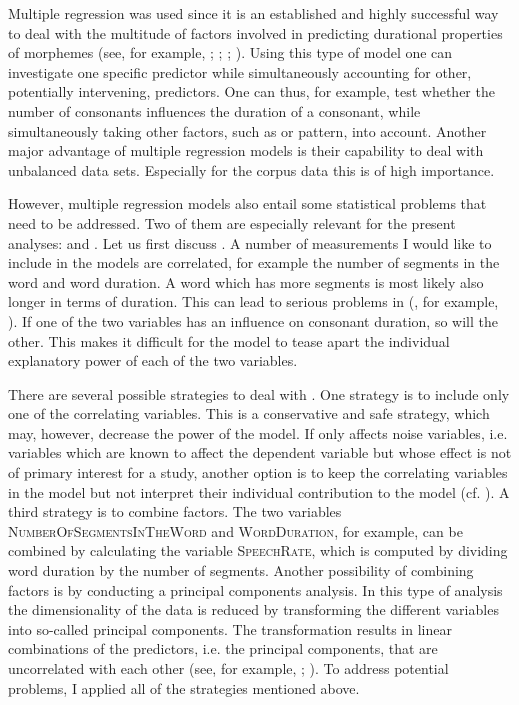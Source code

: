 Multiple regression was used since it is an established and highly successful way to deal with the multitude of factors involved in predicting durational properties of morphemes (see, for example, \citealt{Hay.2007}; \citealt{Hanique.2012}; \citealt{Smith.2012}; \citealt{Plag.2017}). Using this type of model one can investigate one specific predictor while simultaneously accounting for other, potentially intervening, predictors. One can thus, for example, test whether the number of consonants influences the duration of a consonant, while simultaneously taking other factors, such as  or  pattern, into account.  Another major advantage of multiple regression models is their capability to deal with unbalanced data sets. Especially for the corpus data this is of high importance. 

However, multiple regression models also entail some statistical problems that need to be addressed. Two of them are especially relevant for the present analyses:  and . Let us first discuss .
A number of measurements I would like to include in the models are correlated, for example the number of segments in the word and word duration. A word which has more segments is most likely also longer in terms of duration. This can lead to serious problems in  (, for example, \citealt[chapter 6]{Baayen.2008}).  If one of the two variables has an influence on consonant duration, so will the other. This makes it difficult for the model to tease apart the individual explanatory power of each of the two variables. 

There are several possible strategies to deal with . One strategy is to include only one of the correlating variables.  This is a conservative and safe strategy, which may, however, decrease the power of the model. If  only affects noise variables, i.e. variables which are known to affect the dependent variable but whose effect is not of primary interest for a study, another option is to keep the correlating variables in the model but not interpret their individual contribution to the model (cf. \citealt{Wurm.2014}). A third strategy is to combine factors. The two variables \textsc{NumberOfSegmentsInTheWord } and \textsc{WordDuration}, for example, can be combined by calculating the variable \textsc{SpeechRate}, which is computed by dividing word duration by the number of segments. Another possibility of combining factors is by conducting a principal components analysis. In this type of analysis the dimensionality of the data is reduced by transforming the different variables into so-called principal components. The transformation results in linear combinations of the predictors, i.e. the principal components, that are uncorrelated with each other (see, for example, \citealt[chapter 5.1]{Baayen.2008}; \citealt[chapter 12]{Venables.2011}). To address potential  problems, I applied all of the strategies mentioned above. 


